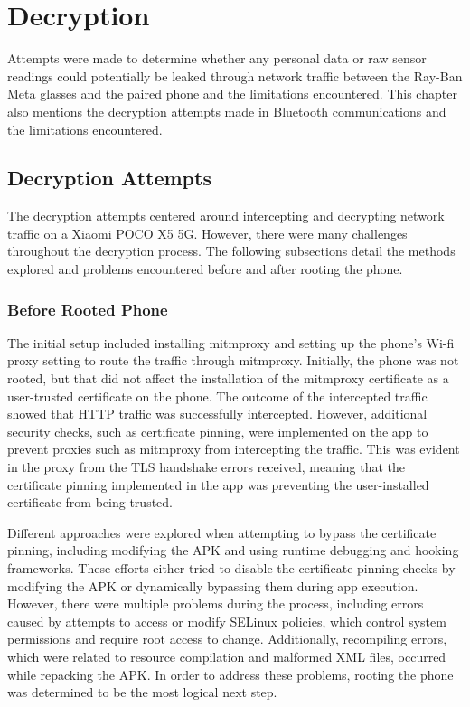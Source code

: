 \chapter{Decryption}
\label{chap:decryption}

Attempts were made to determine whether any personal data or raw sensor readings could potentially be leaked through network traffic between the Ray-Ban Meta glasses and the paired phone and the limitations encountered. This chapter also mentions the decryption attempts made in Bluetooth communications and the limitations encountered.


\section{Decryption Attempts}
The decryption attempts centered around intercepting and decrypting network traffic on a Xiaomi POCO X5 5G. However, there were many challenges throughout the decryption process. The following subsections detail the methods explored and problems encountered before and after rooting the phone.

\subsection*{Before Rooted Phone}
The initial setup included installing mitmproxy and setting up the phone's Wi-fi proxy setting to route the traffic through mitmproxy. Initially, the phone was not rooted, but that did not affect the installation of the mitmproxy certificate as a user-trusted certificate on the phone. The outcome of the intercepted traffic showed that HTTP traffic was successfully intercepted. However, additional security checks, such as certificate pinning, were implemented on the app to prevent proxies such as mitmproxy from intercepting the traffic. This was evident in the proxy from the TLS handshake errors received, meaning that the certificate pinning implemented in the app was preventing the user-installed certificate from being trusted.

Different approaches were explored when attempting to bypass the certificate pinning, including modifying the APK and using runtime debugging and hooking frameworks. These efforts either tried to disable the certificate pinning checks by modifying the APK or dynamically bypassing them during app execution. However, there were multiple problems during the process, including errors caused by attempts to access or modify SELinux policies, which control system permissions and require root access to change. Additionally, recompiling errors, which were related to resource compilation and malformed XML files, occurred while repacking the APK. In order to address these problems, rooting the phone was determined to be the most logical next step.


